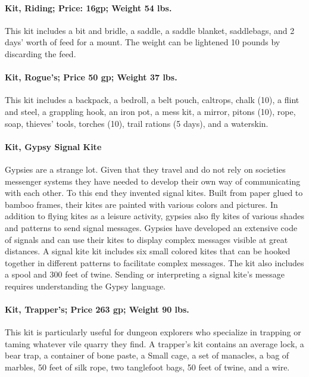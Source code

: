\begin{multicols}{2}
\paragraph{Kit, Riding; Price: 16gp; Weight 54 lbs.}
This kit includes a bit and bridle, a saddle, a saddle blanket, saddlebags, and 2 days' worth of feed for a mount. The weight can be lightened 10 pounds by discarding the feed.

\paragraph{Kit, Rogue's; Price 50 gp; Weight 37 lbs.}
This kit includes a backpack, a bedroll, a belt pouch, caltrops, chalk (10), a flint and steel, a grappling hook, an iron pot, a mess kit, a mirror, pitons (10), rope, soap, thieves' tools, torches (10), trail rations (5 days), and a waterskin.

\paragraph{Kit, Gypsy Signal Kite}

Gypsies are a strange lot. Given that they travel and do not rely on societies messenger systems they have needed to develop their own way of communicating with each other. To this end they invented signal kites. Built from paper glued to bamboo frames, their kites are painted with various colors and pictures. In addition to flying kites as a leisure activity, gypsies also fly kites of various shades and patterns to send signal messages. Gypsies have developed an extensive code of signals and can use their kites to display complex messages visible at great distances. A signal kite kit includes six small colored kites that can be hooked together in different patterns to facilitate complex messages. The kit also includes a spool and 300 feet of twine. Sending or interpreting a signal kite's message requires understanding the Gypsy language.

\paragraph{Kit, Trapper's; Price 263 gp; Weight 90 lbs.}

This kit is particularly useful for dungeon explorers who specialize in trapping or taming whatever vile quarry they find. A trapper's kit contains an average lock, a bear trap, a container of bone paste, a Small cage, a set of manacles, a bag of marbles, 50 feet of silk rope, two tanglefoot bags, 50 feet of twine, and a wire.

% 

\end{multicols}

